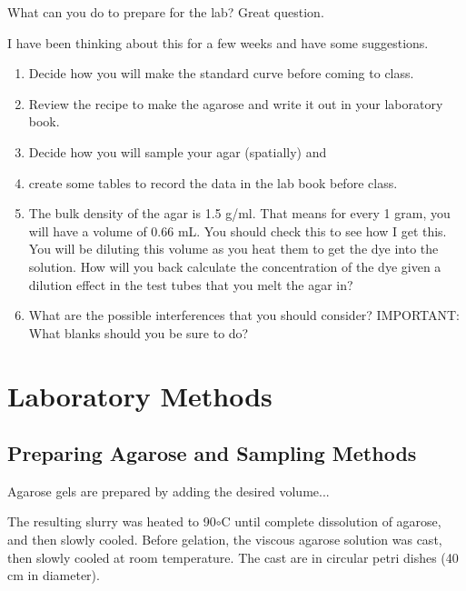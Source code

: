 \documentclass{article}
\begin{document}
What can you do to prepare for the lab?  Great question. 

I have been thinking about this for a few weeks and have some suggestions.

\begin{enumerate}
	\item Decide how you will make the standard curve before coming to class.
	\item Review the recipe to make the agarose and write it out in your laboratory book.
	\item Decide how you will sample your agar (spatially) and 
	\item create some tables to record the data in the lab book before class.

	\item The bulk density of the agar is 1.5 g/ml. That means for every 1 gram, you will have a volume of 0.66 mL.  You should check this to see how I get this.  You will be diluting this volume as you heat them to get the dye into the solution. How will you back calculate the concentration of the dye given a dilution effect in the test tubes that  you melt the agar in?

	\item What are the possible interferences that you should consider?  IMPORTANT: What blanks should you be sure to do?
\end{enumerate}


\section{Laboratory Methods}

\subsection{Preparing Agarose and Sampling Methods}

Agarose gels are prepared by adding the desired volume... 

The resulting slurry was heated to 90$\circ$C until complete dissolution of agarose, and then slowly cooled. Before gelation, the viscous agarose solution was cast, then slowly cooled at room temperature. The cast are in circular petri dishes (40 cm in diameter).

\end{document}

